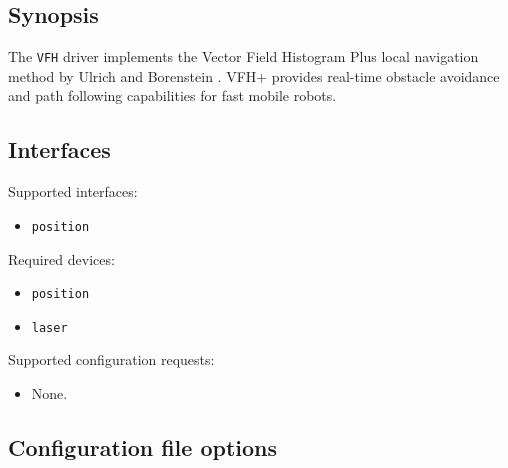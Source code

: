 \subsection*{Synopsis}
The {\tt VFH} driver implements the Vector Field Histogram Plus local navigation method by Ulrich and Borenstein \cite{UlrichBorenstein98}.  VFH+ provides real-time obstacle avoidance and path following capabilities for fast mobile robots.  

\subsection*{Interfaces}

\noindent Supported interfaces:

\begin{itemize}
\item {\tt position}
\end{itemize}

\noindent Required devices:
\begin{itemize}
\item {\tt position}
\item {\tt laser}
\end{itemize}

\noindent Supported configuration requests:
\begin{itemize}
\item None.
\end{itemize}


\subsection*{Configuration file options}

